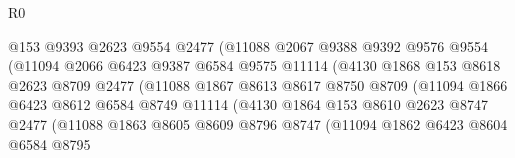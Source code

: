 \begin{lexlean}{R0}
\begin{coremodule}
                                @153
                                @9393
                                @2623
                                @9554
                                @2477
                                (@11088
                                  @2067
                                  @9388
                                  @9392
                                  @9576
                                  @9554
                                  (@11094
                                    @2066
                                    @6423
                                    @9387
                                    @6584
                                    @9575
                                    @11114
                                    (@4130
                                      @1868
                                      @153
                                      @8618
                                      @2623
                                      @8709
                                      @2477
                                      (@11088
                                        @1867
                                        @8613
                                        @8617
                                        @8750
                                        @8709
                                        (@11094
                                          @1866
                                          @6423
                                          @8612
                                          @6584
                                          @8749
                                          @11114
                                          (@4130
                                            @1864
                                            @153
                                            @8610
                                            @2623
                                            @8747
                                            @2477
                                            (@11088
                                              @1863
                                              @8605
                                              @8609
                                              @8796
                                              @8747
                                              (@11094
                                                @1862
                                                @6423
                                                @8604
                                                @6584
                                                @8795

\end{coremodule}
\end{lexlean}
